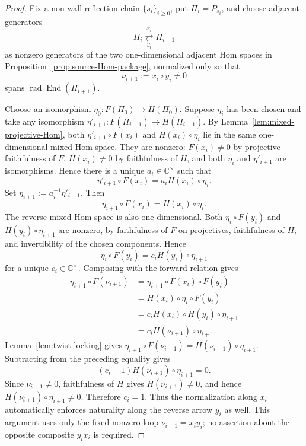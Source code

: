 \documentclass[12pt,leqno]{amsart}
\numberwithin{equation}{section}
\newcommand{\End}{\operatorname{End}}
\newcommand{\rad}{\operatorname{rad}}
\def\C{\mathbb{C}}
\begin{document}
\begin{proof}
Fix a non-wall reflection chain $\{s_i\}_{i\ge0}$, put
$\Pi_i=P_{s_i}$, and choose adjacent generators
\[
 \Pi_i\underset{y_i}{\stackrel{x_i}{\rightleftarrows}}\Pi_{i+1}
\]
as nonzero generators of the two one-dimensional adjacent Hom spaces in
Proposition~\ref{prop:source-Hom-package}, normalized only so that
\begin{equation}\label{eq:zigzag-loop-section6}
 \nu_{i+1}:=x_i\circ y_i\ne0
\end{equation}
spans $\rad\End(\Pi_{i+1})$.

Choose an isomorphism $\eta_0:F(\Pi_0)\to H(\Pi_0)$.  Suppose $\eta_i$
has been chosen and take any isomorphism
$\eta'_{i+1}:F(\Pi_{i+1})\to H(\Pi_{i+1})$.  By
Lemma~\ref{lem:mixed-projective-Hom}, both
$\eta'_{i+1}\circ F(x_i)$ and $H(x_i)\circ\eta_i$ lie in the same one-dimensional
mixed Hom space.  They are nonzero: $F(x_i)\ne0$ by projective faithfulness of $F$,
$H(x_i)\ne0$ by faithfulness of $H$, and both $\eta_i$ and
$\eta'_{i+1}$ are isomorphisms.  Hence there is a unique
$a_i\in\C^\times$ such that
\[
 \eta'_{i+1}\circ F(x_i)=a_i H(x_i)\circ\eta_i.
\]
Set $\eta_{i+1}:=a_i^{-1}\eta'_{i+1}$.  Then
\begin{equation}\label{eq:forward-naturality}
 \eta_{i+1}\circ F(x_i)=H(x_i)\circ\eta_i.
\end{equation}
The reverse mixed Hom space is also one-dimensional.  Both
$\eta_i\circ F(y_i)$ and $H(y_i)\circ\eta_{i+1}$ are nonzero, by
faithfulness of $F$ on projectives, faithfulness of $H$, and invertibility
of the chosen components.  Hence
\begin{equation}\label{eq:reverse-scalar}
 \eta_i\circ F(y_i)=c_iH(y_i)\circ\eta_{i+1}
\end{equation}
for a unique $c_i\in\C^\times$.  Composing with the forward relation gives
\begin{align*}
 \eta_{i+1}\circ F(\nu_{i+1})
 &=\eta_{i+1}\circ F(x_i)\circ F(y_i)\\
 &=H(x_i)\circ\eta_i\circ F(y_i)\\
 &=c_iH(x_i)\circ H(y_i)\circ\eta_{i+1}\\
 &=c_iH(\nu_{i+1})\circ\eta_{i+1}.
\end{align*}
Lemma~\ref{lem:twist-locking} gives
$\eta_{i+1}\circ F(\nu_{i+1})=
H(\nu_{i+1})\circ\eta_{i+1}$.  Subtracting from the
preceding equality gives
\[
 (c_i-1)H(\nu_{i+1})\circ\eta_{i+1}=0.
\]
Since $\nu_{i+1}\ne0$, faithfulness of $H$ gives
$H(\nu_{i+1})\ne0$, and hence
$H(\nu_{i+1})\circ\eta_{i+1}\ne0$.  Therefore $c_i=1$.  Thus the normalization along $x_i$ automatically
enforces naturality along the reverse arrow $y_i$ as well.  This argument
uses only the fixed nonzero loop $\nu_{i+1}=x_i y_i$; no assertion about
the opposite composite $y_i x_i$ is required.


\end{proof}
\end{document}
